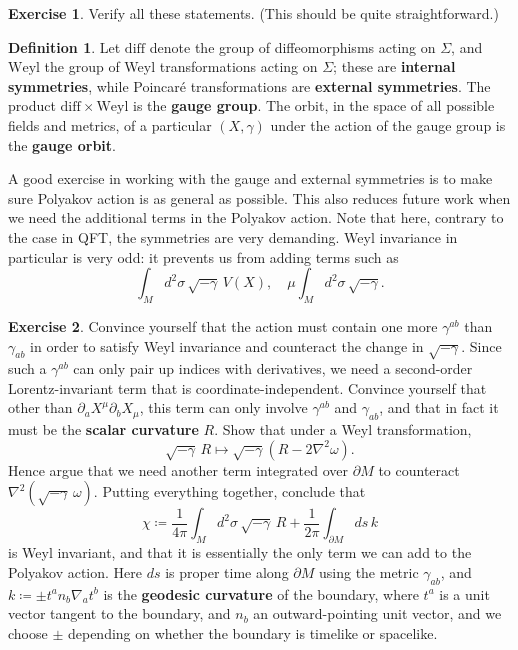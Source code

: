 \documentclass{report}
\theoremstyle{plain}
\theoremstyle{definition}
\newtheorem{definition}[theorem]{Definition}
\newtheorem{exercise}{Exercise}[section]
\theoremstyle{remark}
\newcommand{\di}{\partial}
\newcommand{\diff}{\mathrm{diff}}
\newcommand{\Weyl}{\mathrm{Weyl}}
\begin{document}
\begin{exercise}
  Verify all these statements. (This should be quite straightforward.)
\end{exercise}

\begin{definition}
  Let $\diff$ denote the group of diffeomorphisms acting on $\Sigma$,
  and $\Weyl$ the group of Weyl transformations acting on $\Sigma$;
  these are {\bf internal symmetries}, while Poincar\'e
  transformations are {\bf external symmetries}. The product $\diff
  \times \Weyl$ is the {\bf gauge group}. The orbit, in the space of
  all possible fields and metrics, of a particular $(X, \gamma)$ under
  the action of the gauge group is the {\bf gauge orbit}.
\end{definition}

A good exercise in working with the gauge and external symmetries is
to make sure Polyakov action is as general as possible. This also
reduces future work when we need the additional terms in the Polyakov
action. Note that here, contrary to the case in QFT, the symmetries
are very demanding. Weyl invariance in particular is very odd: it
prevents us from adding terms such as
\[ \int_M d^2\sigma \, \sqrt{-\gamma} \, V(X), \quad \mu \int_M d^2\sigma \, \sqrt{-\gamma}. \]

\begin{exercise}
  Convince yourself that the action must contain one more
  $\gamma^{ab}$ than $\gamma_{ab}$ in order to satisfy Weyl invariance
  and counteract the change in $\sqrt{-\gamma}$. Since such a
  $\gamma^{ab}$ can only pair up indices with derivatives, we need a
  second-order Lorentz-invariant term that is coordinate-independent.
  Convince yourself that other than $\di_a X^\mu \di_b X_\mu$, this
  term can only involve $\gamma^{ab}$ and $\gamma_{ab}$, and that in
  fact it must be the {\bf scalar curvature} $R$. Show that under a
  Weyl transformation,
  \[ \sqrt{-\gamma} \, R \mapsto \sqrt{-\gamma} (R - 2\nabla^2 \omega). \]
  Hence argue that we need another term integrated over $\di M$ to
  counteract $\nabla^2(\sqrt{-\gamma} \, \omega)$. Putting everything
  together, conclude that
  \[ \chi \coloneqq \frac{1}{4\pi} \int_M d^2\sigma \, \sqrt{-\gamma} \, R + \frac{1}{2\pi} \int_{\di M} ds \, k \]
  is Weyl invariant, and that it is essentially the only term we can
  add to the Polyakov action. Here $ds$ is proper time along $\di M$
  using the metric $\gamma_{ab}$, and $k \coloneqq \pm t^a n_b
  \nabla_a t^b$ is the {\bf geodesic curvature} of the boundary, where
  $t^a$ is a unit vector tangent to the boundary, and $n_b$ an
  outward-pointing unit vector, and we choose $\pm$ depending on
  whether the boundary is timelike or spacelike.
\end{exercise}
\end{document}
